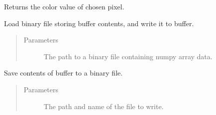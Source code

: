 \documentclass[letterpaper,10pt,english,openany,oneside]{sphinxmanual}
\begin{document}
\begin{fulllineitems}
\begin{fulllineitems}
\end{fulllineitems}



\begin{fulllineitems}

\pysigstartsignatures
{}
\pysigstopsignatures
\sphinxAtStartPar
Returns the color value of chosen pixel.

\end{fulllineitems}



\begin{fulllineitems}

\pysigstartsignatures
{}
\pysigstopsignatures
\sphinxAtStartPar
Load binary file storing buffer contents, and write it to buffer.
\begin{quote}\begin{description}
\item[{Parameters}] \leavevmode
\sphinxAtStartPar
{} \textendash{} The path to a binary file containing numpy array data.

\end{description}\end{quote}

\end{fulllineitems}



\begin{fulllineitems}

\pysigstartsignatures
{}
\pysigstopsignatures
\sphinxAtStartPar
Save contents of buffer to a binary file.
\begin{quote}\begin{description}
\item[{Parameters}] \leavevmode
\sphinxAtStartPar
{} \textendash{} The path and name of the file to write.

\end{description}\end{quote}


\end{fulllineitems}
\end{fulllineitems}
\end{document}
